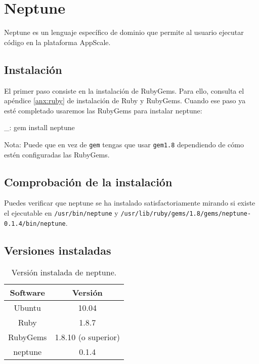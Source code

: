 \chapter{Neptune}
\label{anx:neptune}


Neptune es un lenguaje específico de dominio que permite al usuario ejecutar código en la plataforma AppScale.


\section{Instalación}

El primer paso consiste en la instalación de RubyGems. Para ello, consulta el apéndice \ref{anx:ruby} de instalación de Ruby y RubyGems. Cuando ese paso ya esté completado usaremos las RubyGems para instalar neptune:

\begin{bashcode}
_: gem install neptune
\end{bashcode}

Nota: Puede que en vez de \texttt{gem} tengas que usar \texttt{gem1.8} dependiendo de cómo estén configuradas las RubyGems.


\section{Comprobación de la instalación}

Puedes verificar que neptune se ha instalado satisfactoriamente mirando si existe el ejecutable en \texttt{/usr/bin/neptune} y \texttt{/usr/lib/ruby/gems/1.8/gems/neptune-0.1.4/bin/neptune}.


\section{Versiones instaladas}

\begin{table}[!htbp]
\centering
   \begin{tabular}{|c|c|}
      \hline
      \textbf{Software} & \textbf{Versión} \\ \hline
      Ubuntu & 10.04 \\ \hline
      Ruby & 1.8.7 \\ \hline
      RubyGems & 1.8.10 (o superior) \\ \hline
      neptune & 0.1.4 \\ \hline
   \end{tabular}
\caption{Versión instalada de neptune.}
\label{table:neptune-versions}
\end{table}
